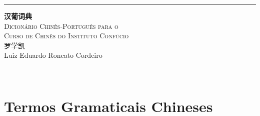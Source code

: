 \documentclass[a4paper,12pt,twoside,openany]{memoir}
\makeatletter
\def\fake@makechapterhead#1{%
  \vspace*{50\p@}%
  {\parindent \z@ \raggedright \normalfont
    \ifnum \c@secnumdepth >\m@ne
        \huge\bfseries \strut%
        \par\nobreak
        \vskip 20\p@
    \fi
    \interlinepenalty\@M
    \Huge \bfseries #1\par\nobreak
    \vskip 40\p@
  }
  \markboth{#1}{\thechapter}
}
\newcommand{\newchapterhead}{\let\@makechapterhead\fake@makechapterhead}
\DeclareRobustCommand{\&}{%
    \ifdim\fontdimen1\font>0pt
        \textsl{\symbol{`\&}}%
    \else
        \symbol{`\&}%
    \fi
}
\makeatother
\begin{document}
\newchapterhead

\begin{titlingpage} %
	
	\raggedleft %
	
	\rule{1pt}{\textheight} %
	\hspace{0.05\textwidth} %
	\parbox[b]{0.75\textwidth}{ %
		
		{\Huge\bfseries 汉葡词典}\\[2\baselineskip] %
		{\large\textsc{Dicionário Chinês-Português para o \\Curso de Chinês do Instituto Confúcio}}\\[4\baselineskip] %
        {\Large\textsc{罗学凯}\\\tiny Luiz Eduardo Roncato Cordeiro} %
		
		\vspace{0.5\textheight} %
		
		{\noindent \zhtoday}\\[\baselineskip] %
	}

\end{titlingpage}

\tableofcontents

\newpage

\chapter{Termos Gramaticais Chineses}
\end{document}
